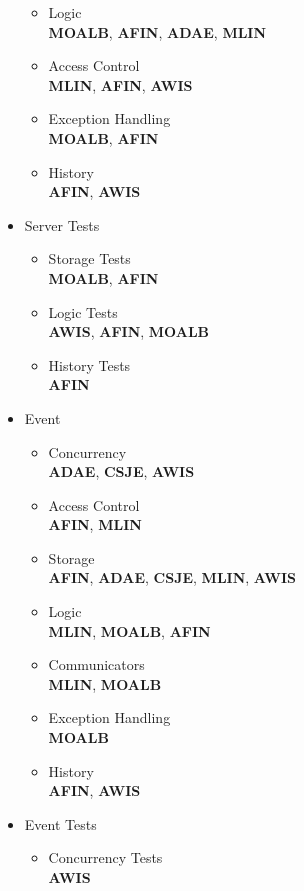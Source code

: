 \begin{itemize}
\begin{itemize}
		\item Logic\\
		\textbf{MOALB}, \textbf{AFIN}, \textbf{ADAE}, \textbf{MLIN} 
		\item Access Control\\
		\textbf{MLIN}, \textbf{AFIN}, \textbf{AWIS}
		\item Exception Handling\\
		\textbf{MOALB}, \textbf{AFIN}
		\item History\\
		\textbf{AFIN}, \textbf{AWIS}
	\end{itemize}
	\item Server Tests
	\begin{itemize}
		\item Storage Tests\\
		\textbf{MOALB}, \textbf{AFIN}
		\item Logic Tests\\
		\textbf{AWIS}, \textbf{AFIN}, \textbf{MOALB}
		\item History Tests\\
		\textbf{AFIN}
	\end{itemize}
	\item Event
	\begin{itemize}
		\item Concurrency\\
		\textbf{ADAE}, \textbf{CSJE}, \textbf{AWIS}
		\item Access Control\\
		\textbf{AFIN}, \textbf{MLIN}
		\item Storage\\
		\textbf{AFIN}, \textbf{ADAE}, \textbf{CSJE}, \textbf{MLIN}, \textbf{AWIS}
		\item Logic\\
		\textbf{MLIN}, \textbf{MOALB}, \textbf{AFIN} 
		\item Communicators\\
		\textbf{MLIN}, \textbf{MOALB}
		\item Exception Handling\\
		\textbf{MOALB}
		\item History\\
		\textbf{AFIN}, \textbf{AWIS}
	\end{itemize}
	\item Event Tests
	\begin{itemize}
		\item Concurrency Tests\\
		\textbf{AWIS}

\end{itemize}
\end{itemize}
